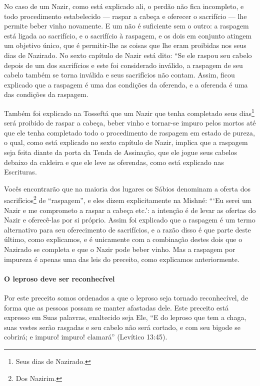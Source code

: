 No caso de um Nazir, como está explicado ali, o perdão não fica
incompleto, e todo procedimento estabelecido --- raspar a cabeça e
oferecer o sacrifício --- lhe permite beber vinho novamente. E um não é
suficiente sem o outro: a raspagem está ligada ao sacrifício, e o
sacrifício à raspagem, e os dois em conjunto atingem um objetivo único,
que é permitir-lhe as coisas que lhe eram proibidas nos seus dias de
Nazirado. No sexto capítulo de Nazir está dito: ``Se ele raspou seu
cabelo depois de um dos sacrifícios e este foi considerado inválido, a
raspagem de seu cabelo também se torna inválida e seus sacrifícios não
contam. Assim, ficou explicado que a raspagem é uma das condições da
oferenda, e a oferenda é uma das condições da raspagem.

Também foi explicado na Tosseftá que um Nazir que tenha completado seus dias\footnote{Seus dias de Nazirado.} será proibido de raspar a cabeça,
beber vinho e tornar-se impuro pelos mortos até que ele tenha completado todo o procedimento de raspagem em estado de pureza, o qual, como está explicado no sexto capítulo de Nazir, implica que a raspagem seja feita diante da porta da Tenda de
Assinação, que ele jogue seus cabelos debaixo da caldeira e que ele
leve as oferendas, como está explicado nas Escrituras.

Vocês encontrarão que na maioria dos lugares os Sábios denominam
a oferta dos sacrifícios\footnote{Dos Nazirim.} de ``raspagem'', e eles
dizem explicitamente na Mishné: ```Eu serei um Nazir e me comprometo a
raspar a cabeça etc.': a intenção é de levar as ofertas do Nazir e
oferecê-las por si próprio. Assim foi explicado que a raspagem é um
termo alternativo para seu oferecimento de sacrifícios, e a razão disso
é que parte deste último, como explicamos, e é unicamente com a
combinação destes dois que o Nazirado se completa e que o Nazir pode
beber vinho. Mas a raspagem por impureza é apenas uma das leis do
preceito, como explicamos anteriormente.

\paragraph{O leproso deve ser reconhecível}

Por este preceito somos ordenados a que o leproso seja tornado
reconhecível, de forma que as pessoas possam se manter afastadas dele.
Este preceito está expresso em Suas palavras, enaltecido seja Ele, ``E
do leproso que tem a chaga, suas vestes serão rasgadas e seu cabelo não
será cortado, e com seu bigode se cobrirá; e impuro! impuro! clamará''
(Levítico 13:45).

